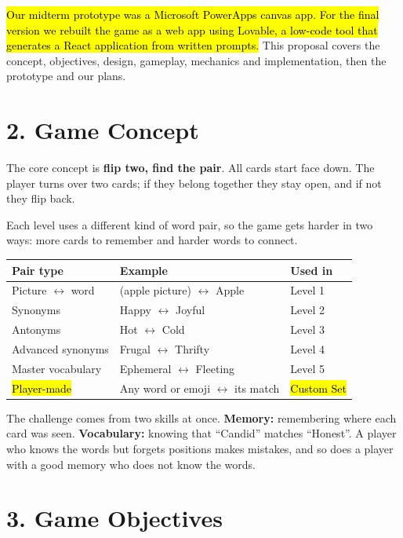\documentclass[11pt,a4paper]{article}
\begin{document}
\hl{Our midterm prototype was a Microsoft PowerApps canvas app. For the final version we rebuilt the game as a web app using Lovable, a low-code tool that generates a React application from written prompts.} This proposal covers the concept, objectives, design, gameplay, mechanics and implementation, then the prototype and our plans.

\section{2. Game Concept}
The core concept is \textbf{flip two, find the pair}. All cards start face down. The player turns over two cards; if they belong together they stay open, and if not they flip back.

Each level uses a different kind of word pair, so the game gets harder in two ways: more cards to remember and harder words to connect.

\begin{tabularx}{\textwidth}{|L|L|p{3cm}|}
\hline
{}\textbf{Pair type} & \textbf{Example} & \textbf{Used in} \\ \hline
Picture $\leftrightarrow$ word & (apple picture) $\leftrightarrow$ Apple & Level 1 \\ \hline
Synonyms & Happy $\leftrightarrow$ Joyful & Level 2 \\ \hline
Antonyms & Hot $\leftrightarrow$ Cold & Level 3 \\ \hline
Advanced synonyms & Frugal $\leftrightarrow$ Thrifty & Level 4 \\ \hline
Master vocabulary & Ephemeral $\leftrightarrow$ Fleeting & Level 5 \\ \hline
\hl{Player-made} & Any word or emoji $\leftrightarrow$ its match & \hl{Custom Set} \\ \hline
\end{tabularx}

The challenge comes from two skills at once. \textbf{Memory:} remembering where each card was seen. \textbf{Vocabulary:} knowing that ``Candid'' matches ``Honest''. A player who knows the words but forgets positions makes mistakes, and so does a player with a good memory who does not know the words.

\section{3. Game Objectives}
\end{document}
